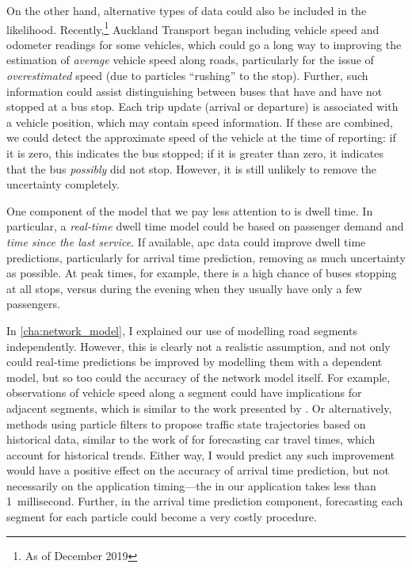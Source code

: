 On the other hand, alternative types of data could also be included in the likelihood. Recently,\footnote{As of December 2019} Auckland Transport began including vehicle speed and odometer readings for some vehicles, which could go a long way to improving the estimation of \emph{average} vehicle speed along roads, particularly for the issue of \emph{overestimated} speed (due to particles ``rushing'' to the stop). Further, such information could assist distinguishing between buses that have and have not stopped at a bus stop. Each trip update (arrival or departure) is associated with a vehicle position, which may contain speed information. If these are combined, we could detect the approximate speed of the vehicle at the time of reporting: if it is zero, this indicates the bus stopped; if it is greater than zero, it indicates that the bus \emph{possibly} did not stop. However, it is still unlikely to remove the uncertainty completely.


One component of the model that we pay less attention to is dwell time. In particular, a \emph{real-time} dwell time model could be based on passenger demand and \emph{time since the last service}. If available, \gls{apc} data could improve dwell time predictions, particularly for arrival time prediction, removing as much uncertainty as possible. At peak times, for example, there is a high chance of buses stopping at all stops, versus during the evening when they usually have only a few passengers.



In \cref{cha:network_model}, I explained our use of modelling road segments independently. However, this is clearly not a realistic assumption, and not only could real-time predictions be improved by modelling them with a dependent model, but so too could the accuracy of the network model itself. For example, observations of vehicle speed along a segment could have implications for adjacent segments, which is similar to the work presented by \citet{Julio_2016}. Or alternatively, methods using particle filters to propose traffic state trajectories based on historical data, similar to the work of \citet{Chen_2014} for forecasting car travel times, which account for historical trends. Either way, I would predict any such improvement would have a positive effect on the accuracy of arrival time prediction, but not necessarily on the application timing---the \kf{} in our application takes less than 1~millisecond. Further, in the arrival time prediction component, forecasting each segment for each particle could become a very costly procedure.


